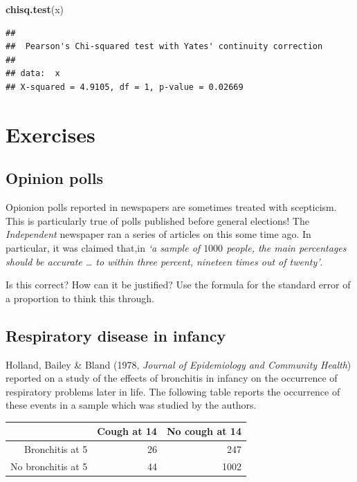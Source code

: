 \documentclass[
]{book}
\newenvironment{Shaded}{\begin{snugshade}}{\end{snugshade}}
\newcommand{\FunctionTok}[1]{\textcolor[rgb]{0.13,0.29,0.53}{\textbf{#1}}}
\newcommand{\NormalTok}[1]{#1}
\begin{document}
\begin{Shaded}
\begin{Highlighting}[]
\FunctionTok{chisq.test}\NormalTok{(x)}
\end{Highlighting}
\end{Shaded}

\begin{verbatim}
## 
##  Pearson's Chi-squared test with Yates' continuity correction
## 
## data:  x
## X-squared = 4.9105, df = 1, p-value = 0.02669
\end{verbatim}

\section{Exercises}\label{exercises-2}

\subsection{Opinion polls}\label{opinion-polls}

Opionion polls reported in newspapers are sometimes treated with scepticism. This is particularly true of polls published before general elections! The \emph{Independent} newspaper ran a series of articles on this some time ago. In particular, it was claimed that,in \emph{`a sample of \(1000\) people, the main percentages should be accurate \ldots{} to within three percent, nineteen times out of twenty'}.

Is this correct? How can it be justified? Use the formula for the standard error of a proportion to think this through.

\subsection{Respiratory disease in infancy}\label{respiratory-disease-in-infancy}

Holland, Bailey \& Bland (1978, \emph{Journal of Epidemiology and Community Health}) reported on a study of the effects of bronchitis in infancy on the occurrence of respiratory problems later in life. The following table reports the occurrence of these events in a sample which was studied by the authors.

\begin{tabular}{r|r|r}
\hline
 & Cough at 14 & No cough at 14\\
\hline
Bronchitis at 5 & 26 & 247\\
\hline
No bronchitis at 5 & 44 & 1002\\
\hline
\end{tabular}
\end{document}
